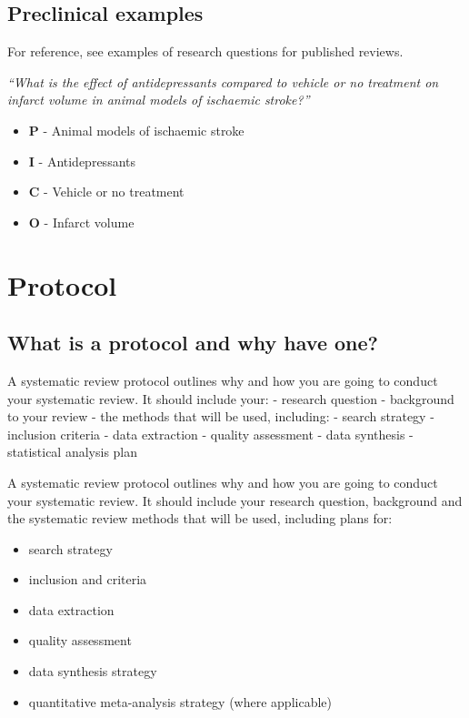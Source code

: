 \documentclass[
]{book}
\providecommand{\tightlist}{%
  \setlength{\itemsep}{0pt}\setlength{\parskip}{0pt}}
\begin{document}
\hypertarget{preclinical-examples}{%
\section{Preclinical examples}\label{preclinical-examples}}

For reference, see examples of research questions for published reviews.

\emph{``What is the effect of antidepressants compared to vehicle or no treatment on infarct volume in animal models of ischaemic stroke?''}

\begin{itemize}
\tightlist
\item
  \textbf{P} - Animal models of ischaemic stroke\\
\item
  \textbf{I} - Antidepressants
\item
  \textbf{C} - Vehicle or no treatment
\item
  \textbf{O} - Infarct volume
\end{itemize}

\hypertarget{protocol}{%
\chapter{Protocol}\label{protocol}}

\hypertarget{what-is-a-protocol-and-why-have-one}{%
\section{What is a protocol and why have one?}\label{what-is-a-protocol-and-why-have-one}}

A systematic review protocol outlines why and how you are going to conduct your systematic review. It should include your:
- research question
- background to your review
- the methods that will be used, including:
- search strategy
- inclusion criteria
- data extraction
- quality assessment
- data synthesis
- statistical analysis plan

A systematic review protocol outlines why and how you are going to conduct your systematic review. It should include your research question, background and the systematic review methods that will be used, including plans for:

\begin{itemize}
\tightlist
\item
  search strategy
\item
  inclusion and criteria
\item
  data extraction
\item
  quality assessment
\item
  data synthesis strategy
\item
  quantitative meta-analysis strategy (where applicable)
\end{itemize}
\end{document}
